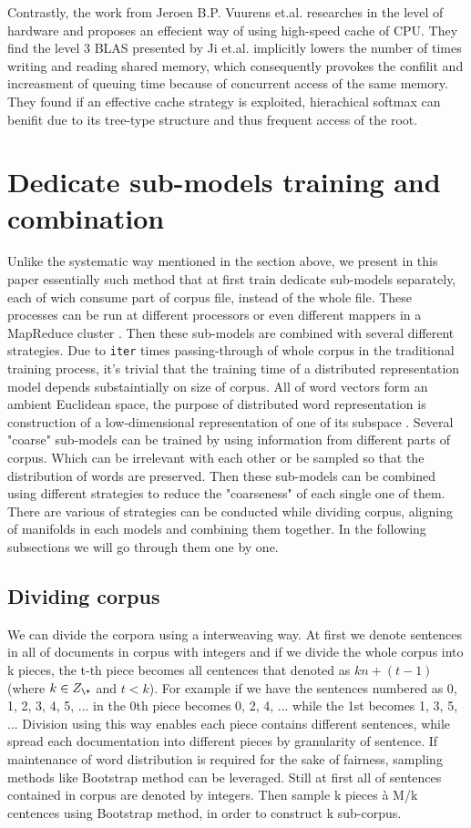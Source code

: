 \documentclass[11pt,a4paper]{article}
\begin{document}
Contrastly, the work from Jeroen B.P. Vuurens et.al. \cite{eickhoff2016efficient} researches in the level of hardware and proposes an effecient way of using high-speed cache of CPU. They find the level 3 BLAS presented by Ji et.al. implicitly lowers the number of times writing and reading shared memory, which consequently provokes the confilit and increasment of queuing time because of concurrent access of the same memory. They found if an effective cache strategy is exploited, hierachical softmax can benifit due to its tree-type structure and  thus frequent access of the root.

\section{Dedicate sub-models training and combination}
Unlike the systematic way mentioned in the section above, we present in this paper essentially such method that at first train dedicate sub-models separately, each of wich consume part of corpus file, instead of the whole file. These processes can be run at different processors or even different mappers in a MapReduce cluster \cite{dean2008mapreduce}. Then these sub-models are combined with several different strategies. Due to \verb|iter| times passing-through of whole corpus in the traditional training process, it's trivial that the training time of a distributed representation model depends substaintially on size of corpus. All of word vectors form an ambient Euclidean space, the purpose of distributed word representation is construction of a low-dimensional representation of one of its subspace \cite{Mahadevan2015reasoning}. Several "coarse" sub-models can be trained by using information from different parts of corpus. Which can be irrelevant with each other or be sampled so that the distribution of words are preserved. Then these sub-models can be combined using different strategies to reduce the "coarseness" of each single one of them. There are various of strategies can be conducted while dividing corpus, aligning of manifolds in each models and combining them together. In the following subsections we will go through them one by one.

  \subsection{Dividing corpus}
  We can divide the corpora using a interweaving way. At first we denote sentences in all of documents in corpus with integers and if we divide the whole corpus into k pieces, the t-th piece becomes all centences that denoted as $kn+(t-1)$ (where $k\in Z_\+$ and $t<k$). For example if we have the sentences numbered as 0, 1, 2, 3, 4, 5, ... in the 0th piece becomes 0, 2, 4, ... while the 1st becomes 1, 3, 5, ... Division using this way enables each piece contains different sentences, while spread each documentation into different pieces by granularity of sentence.
  If maintenance of word distribution is required for the sake of fairness, sampling methods like Bootstrap method \cite{efron1992bootstrap} can be leveraged. Still at first all of sentences contained in corpus are denoted by integers. Then sample k pieces {\`a} M/k centences using Bootstrap method, in order to construct k sub-corpus.
\end{document}
